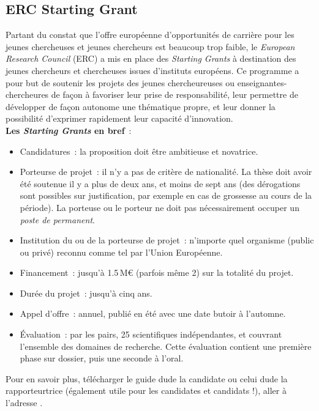 \subsection{ERC Starting Grant}

Partant du constat que l'offre europ\'eenne d'opportunit\'es de carri\`ere pour les jeunes chercheuses et jeunes chercheurs est
 beaucoup trop faible, le \textit{European Research Council} (ERC) a mis en place 
 des \textit{Starting Grants}
\`a destination des jeunes chercheurs et chercheuses issu\mp e\mp s d'instituts europ\'eens. Ce programme a pour but de soutenir
 les projets des jeunes chercheur\mp euse\mp s ou enseignant\mp e\mp s-chercheur\mp e\mp s de fa\c con \`a favoriser leur prise de
responsabilit\'e, leur permettre de d\'evelopper de fa\c con autonome une th\'ematique propre, 
et leur donner la possibilit\'e d'exprimer rapidement leur capacit\'e d'innovation. \\

\textbf{Les \textit{Starting Grants} en bref}~:
\begin{itemize}
\item Candidatures~: la proposition doit \^etre ambitieuse et novatrice.
\item Porteur\mp se de projet~: il n'y a pas de crit\`ere de nationalit\'e. La th\`ese doit avoir \'et\'e soutenue il y a plus de deux ans, et moins de sept ans (des d\'erogations sont possibles sur justification, par exemple en cas de grossesse au cours de la p\'eriode). La porteuse ou le porteur ne doit pas n{\'e}cessairement occuper un \textit{poste de permanent}.
\item Institution du ou de la porteur\mp se de projet~: n'importe quel organisme (public ou priv\'e) reconnu comme tel par l'Union Europ\'eenne.
\item Financement~: jusqu'\`a 1.5\,M\euro{} (parfois m\^eme 2) sur la totalit\'e du projet.
\item Dur\'ee du projet~: jusqu'\`a cinq ans.
\item Appel d'offre~: annuel, publi\'e en \'et\'e avec une date butoir \`a l'automne.
\item \'Evaluation~: par les pairs, 25 scientifiques ind\'ependant\mp e\mp s, et couvrant l'ensemble des domaines de recherche. Cette {\'e}valuation contient une premi{\`e}re phase sur dossier, puis une seconde {\`a} l'oral.
\end{itemize}
Pour en savoir plus, t\'el\'echarger le guide du\mp de la candidat\mp e ou celui du\mp de la rapporteur\mp trice (\'egalement utile pour les candidates et candidats !), aller \`a l'adresse 
.


